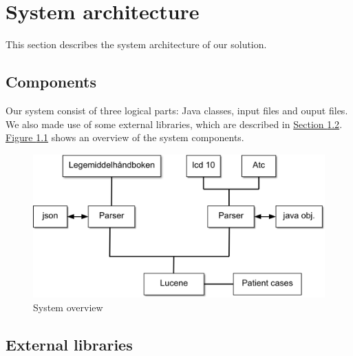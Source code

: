 \chapter{System architecture}
\label{cha:architecture}

This section describes the system architecture of our solution.


\section{Components}
\label{sec:components}

Our system consist of three logical parts: Java classes, input files and ouput
files. We also made use of some external libraries, which are described in
\hyperref[sec:external-libraries]{Section \ref*{sec:external-libraries}}.
\hyperref[fig:system-overview]{Figure \ref*{fig:system-overview}} shows an
overview of the system components.

\begin{figure}[htb]
\begin{center}
	\includegraphics[width=\textwidth]{figures/system-overview}
\end{center}
\caption{System overview}
\label{fig:system-overview}
\end{figure}


\section{External libraries}
\label{sec:external-libraries}

